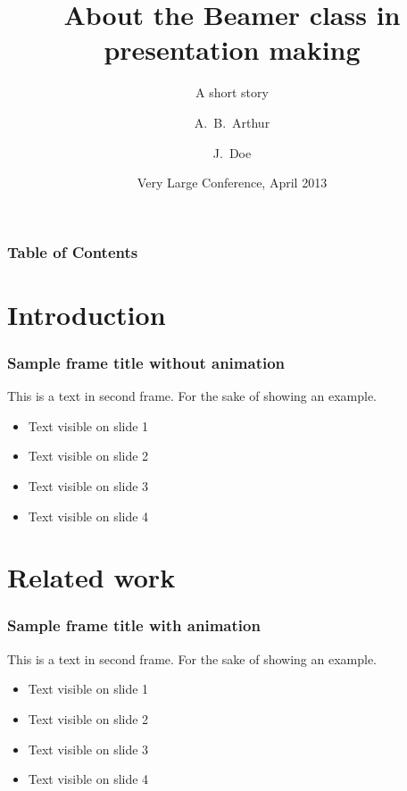 \documentclass[14pt]{beamer}
\title[About Beamer] %
{About the Beamer class in presentation making}
\subtitle{A short story}
\author[Arthur, Doe] %
{A.~B.~Arthur\inst{1} \and J.~Doe\inst{2}}
\institute[VFU] %
{
  \inst{1}%
  Faculty of Physics\\
  Very Famous University
  \and
  \inst{2}%
  Faculty of Chemistry\\
  Very Famous University
}
\date[VLC 2020] %
{Very Large Conference, April 2013}
\begin{document}
\frame{\titlepage}


\begin{frame}
\frametitle{Table of Contents}

\tableofcontents

\end{frame}



\section{Introduction}

\begin{frame}
\frametitle{Sample frame title without animation}

This is a text in second frame. For the sake of showing an example.

\begin{itemize}
 \item Text visible on slide 1
 \item Text visible on slide 2
 \item Text visible on slide 3 
 \item Text visible on slide 4
\end{itemize}

\end{frame}


\section{Related work}

\begin{frame}
\frametitle{Sample frame title with animation}
This is a text in second frame. For the sake of showing an example.

\begin{itemize}
 \item<1-> Text visible on slide 1
 \item<2-> Text visible on slide 2
 \item<3-> Text visible on slide 3 %
 \item<4-> Text visible on slide 4
\end{itemize}

\end{frame}
\end{document}
